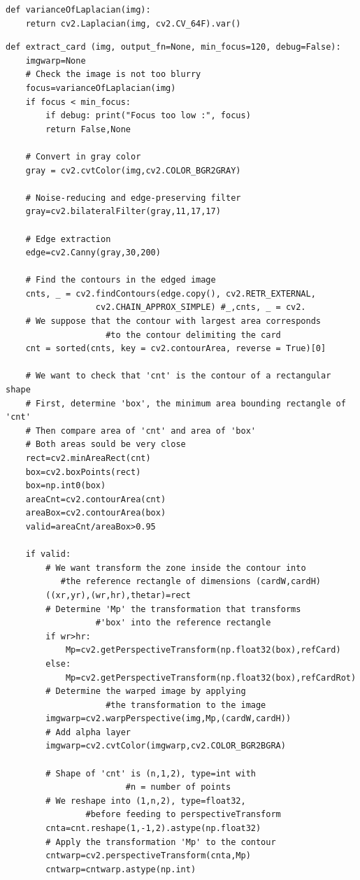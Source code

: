 \documentclass[12pt, а4paper]{article}
\begin{document}
\begin{verbatim}
def varianceOfLaplacian(img):
    return cv2.Laplacian(img, cv2.CV_64F).var()
\end{verbatim}
\newpage
\begin{verbatim}
def extract_card (img, output_fn=None, min_focus=120, debug=False):
    imgwarp=None    
    # Check the image is not too blurry
    focus=varianceOfLaplacian(img)
    if focus < min_focus: 
        if debug: print("Focus too low :", focus)
        return False,None
    
    # Convert in gray color
    gray = cv2.cvtColor(img,cv2.COLOR_BGR2GRAY)
    
    # Noise-reducing and edge-preserving filter
    gray=cv2.bilateralFilter(gray,11,17,17)
    
    # Edge extraction
    edge=cv2.Canny(gray,30,200)
    
    # Find the contours in the edged image
    cnts, _ = cv2.findContours(edge.copy(), cv2.RETR_EXTERNAL, 
			      cv2.CHAIN_APPROX_SIMPLE) #_,cnts, _ = cv2.    
    # We suppose that the contour with largest area corresponds 
				    #to the contour delimiting the card
    cnt = sorted(cnts, key = cv2.contourArea, reverse = True)[0]
    
    # We want to check that 'cnt' is the contour of a rectangular shape
    # First, determine 'box', the minimum area bounding rectangle of 'cnt'
    # Then compare area of 'cnt' and area of 'box'
    # Both areas sould be very close
    rect=cv2.minAreaRect(cnt)
    box=cv2.boxPoints(rect)
    box=np.int0(box)
    areaCnt=cv2.contourArea(cnt)
    areaBox=cv2.contourArea(box)
    valid=areaCnt/areaBox>0.95
    
    if valid:
        # We want transform the zone inside the contour into 
		   #the reference rectangle of dimensions (cardW,cardH)
        ((xr,yr),(wr,hr),thetar)=rect
        # Determine 'Mp' the transformation that transforms 
				  #'box' into the reference rectangle
        if wr>hr:
            Mp=cv2.getPerspectiveTransform(np.float32(box),refCard)
        else:
            Mp=cv2.getPerspectiveTransform(np.float32(box),refCardRot)
        # Determine the warped image by applying
				    #the transformation to the image
        imgwarp=cv2.warpPerspective(img,Mp,(cardW,cardH))
        # Add alpha layer
        imgwarp=cv2.cvtColor(imgwarp,cv2.COLOR_BGR2BGRA)
        
        # Shape of 'cnt' is (n,1,2), type=int with
						#n = number of points
        # We reshape into (1,n,2), type=float32,
				#before feeding to perspectiveTransform
        cnta=cnt.reshape(1,-1,2).astype(np.float32)
        # Apply the transformation 'Mp' to the contour
        cntwarp=cv2.perspectiveTransform(cnta,Mp)
        cntwarp=cntwarp.astype(np.int)
        

\end{verbatim}
\end{document}
